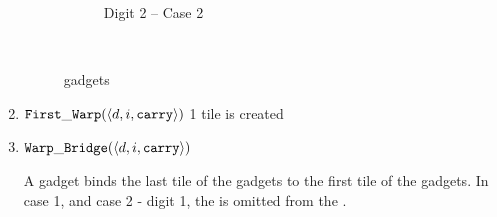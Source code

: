 \begin{enumerate}[label={--}]
\begin{figure}[H]
\begin{subfigure}[t]{0.2\textwidth}
                        \caption{\label{fig:warping/pre_warp_case2_digit2_msr} Digit 2 -- Case 2}
                    \end{subfigure}%
                    ~
                    \caption{\label{fig:pre_warp_gadgets} {\prewarp} gadgets }
                \end{figure}


            \item ${\tt First\_Warp} (\langle d, i, {\tt carry}\rangle)$
                1 tile is created

            \item ${\tt Warp\_Bridge}(\langle d, i, {\tt carry}\rangle)$

                A {\warpbridge} gadget binds the last tile of the {\firstwarp} gadgets to the
                first tile of the {\secondwarp} gadgets. In case 1, and case 2 - digit 1, the
                {\warpbridge} is omitted from the {\warpunit}.


\end{enumerate}
